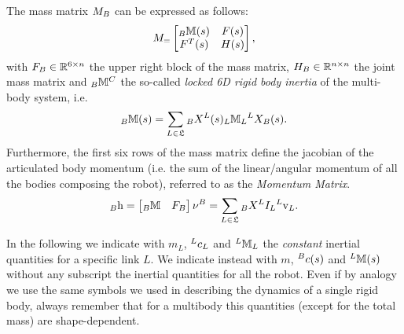 \begin{theorem}
\label{thm:massMatrixStructure}
The mass matrix ${{M}}_{B}$ can be expressed as follows:
\begin{equation}
\label{eq:massMatrixStructure}
{{M}}_{=} 
\begin{bmatrix}
\hspace{0em}_{B} \mathbb{M}(s) & F(s) \\
F^{T}(s) & H(s)
\end{bmatrix},
\end{equation}
with $F_B \in \mathbb{R}^{6 \times n}$ the upper right block of the mass matrix, $H_B \in \mathbb{R}^{n \times n}$ the joint mass matrix and
$\hspace{0em}_{{B}} \mathbb{M}^C$ the so-called \emph{locked 6D rigid body inertia}  of the multi-body system, i.e. 
\begin{equation}
\hspace{0em}_{{B}} \mathbb{M}(s) = \sum_{L \in \mathfrak{L}} \hspace{0em}_{{B}} X^L(s) \hspace{0em}_L \mathbb{M}_L \hspace{0em}^L X_{{B}}(s).
 \end{equation}
Furthermore, 
the first six rows of the mass matrix define the jacobian of the articulated body momentum (i.e. the sum of the linear/angular momentum of all the bodies composing the robot), referred to as the \emph{Momentum Matrix}. 
\begin{equation}
\label{eq:momentumMatrix}
{}_{{B}} {\rm h} =
\begin{bmatrix}
\hspace{0em}_{{B}} \mathbb{M} & F_B
\end{bmatrix} {\nu}^{B} = 
 \sum_{L \in \mathfrak{L}} \hspace{0em}_{{B}} X^L I_L \hspace{0em}^L {\rm v}_L.
\end{equation}
\end{theorem}

\begin{remark}
In the following we indicate with $m_L$, $\hspace{0em}^L c_L$ and $\hspace{0em}^L \mathbb{M}_L$ the \emph{constant} inertial quantities for a specific link $L$. We indicate instead with $m$, $\hspace{0em}^B c(s)$ and $\hspace{0em}^L \mathbb{M}(s)$ without any subscript the inertial quantities for all the robot. Even if by analogy we use the same symbols we used in describing the dynamics of a single rigid body, always remember that for a multibody this quantities (except for the total mass) are shape-dependent.   
\end{remark}


